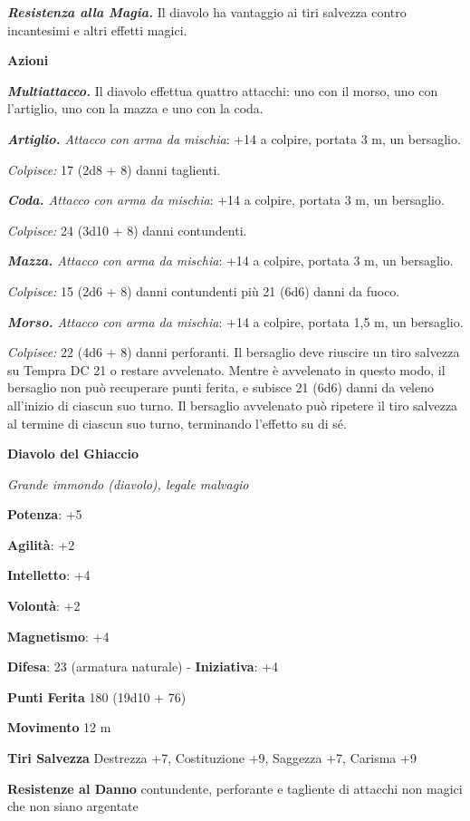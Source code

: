 \begin{multicols}{2}
\emph{\textbf{Resistenza alla Magia.}} Il diavolo ha vantaggio ai tiri
salvezza contro incantesimi e altri effetti magici.

\textbf{Azioni}

\emph{\textbf{Multiattacco.}} Il diavolo effettua quattro attacchi: uno
con il morso, uno con l'artiglio, uno con la mazza e uno con la coda.

\emph{\textbf{Artiglio.} Attacco con arma da mischia}: +14 a colpire,
portata 3 m, un bersaglio.

\emph{Colpisce:} 17 (2d8 + 8) danni taglienti.

\emph{\textbf{Coda.} Attacco con arma da mischia}: +14 a colpire,
portata 3 m, un bersaglio.

\emph{Colpisce:} 24 (3d10 + 8) danni contundenti.

\emph{\textbf{Mazza.} Attacco con arma da mischia}: +14 a colpire,
portata 3 m, un bersaglio.

\emph{Colpisce:} 15 (2d6 + 8) danni contundenti più 21 (6d6) danni da
fuoco.

\emph{\textbf{Morso.} Attacco con arma da mischia}: +14 a colpire,
portata 1,5 m, un bersaglio.

\emph{Colpisce:} 22 (4d6 + 8) danni perforanti. Il bersaglio deve
riuscire un tiro salvezza su Tempra DC 21 o restare avvelenato.
Mentre è avvelenato in questo modo, il bersaglio non può recuperare
punti ferita, e subisce 21 (6d6) danni da veleno all'inizio di ciascun
suo turno. Il bersaglio avvelenato può ripetere il tiro salvezza al
termine di ciascun suo turno, terminando l'effetto su di sé.

\textbf{Diavolo del Ghiaccio}

\emph{Grande immondo (diavolo), legale malvagio}

\textbf{Potenza}: +5

\textbf{Agilità}: +2

\textbf{Intelletto}: +4

\textbf{Volontà}: +2

\textbf{Magnetismo}: +4

\textbf{Difesa}: 23 (armatura naturale) - \textbf{Iniziativa}: +4

\textbf{Punti Ferita} 180 (19d10 + 76)

\textbf{Movimento} 12 m

\textbf{Tiri Salvezza} Destrezza +7, Costituzione +9, Saggezza +7,
Carisma +9

\textbf{Resistenze al Danno} contundente, perforante e tagliente di
attacchi non magici che non siano argentate


\end{multicols}
